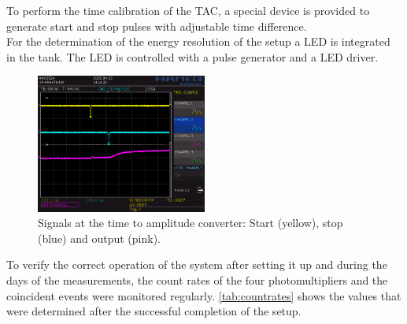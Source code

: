To perform the time calibration of the TAC, a special device is provided to generate start and stop
pulses with adjustable time difference.\\

For the determination of the energy resolution of the setup a LED is integrated in the tank.
The LED is controlled with a pulse generator and a LED driver.


\begin{figure}[H]
\begin{center}
  \includegraphics[width=0.5\textwidth]{../img/S0008.PNG}
  \caption{Signals at the time to amplitude converter: Start (yellow), stop (blue) and output (pink).}
  \label{img:tac}
\end{center}
\end{figure}

To verify the correct operation of the system after setting it up and during the days of the measurements,
the count rates of the four photomultipliers and the coincident events were monitored regularly.
\autoref{tab:countrates} shows the values that were determined after the successful completion of the setup.

